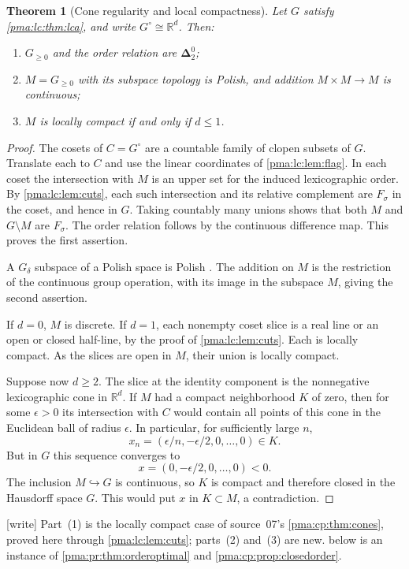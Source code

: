 \documentclass[11pt]{article}
\numberwithin{equation}{section}
\newtheorem{theorem}{Theorem}[section]
\theoremstyle{definition}
\theoremstyle{remark}
\newcommand{\R}{\mathbb R}
\newcommand{\Dtwo}{\boldsymbol{\Delta}^{0}_{2}}
\newcommand{\writetag}{\textup{\textsf{\small[write]}}}
\begin{document}
\begin{theorem}[Cone regularity and local compactness]\label{pma:lc:thm:cones}
Let $G$ satisfy \cref{pma:lc:thm:lca}, and write $G^\circ\cong\R^d$. Then:
\begin{enumerate}
\item $G_{\ge0}$ and the order relation are $\Dtwo$;
\item $M=G_{\ge0}$ with its subspace topology is Polish, and addition
      $M\times M\to M$ is continuous;
\item $M$ is locally compact if and only if $d\le1$.
\end{enumerate}
\end{theorem}
\begin{proof}
The cosets of $C=G^\circ$ are a countable family of clopen subsets of
$G$. Translate each to $C$ and use the linear coordinates of
\cref{pma:lc:lem:flag}. In each coset the intersection with $M$ is an upper
set for the induced lexicographic order. By \cref{pma:lc:lem:cuts}, each such
intersection and its relative complement are $F_\sigma$ in the coset,
and hence in $G$. Taking countably many unions shows that both $M$ and
$G\setminus M$ are $F_\sigma$. The order relation follows by the
continuous difference map. This proves the first assertion.

A $G_\delta$ subspace of a Polish space is Polish \cite{Kechris}.
The addition on $M$ is the restriction of the continuous group operation,
with its image in the subspace $M$, giving the second assertion.

If $d=0$, $M$ is discrete. If $d=1$, each nonempty coset slice is a real
line or an open or closed half-line, by the proof of \cref{pma:lc:lem:cuts}.
Each is locally compact. As the slices are open in $M$, their union is
locally compact.

Suppose now $d\ge2$. The slice at the identity component is the
nonnegative lexicographic cone in $\R^d$. If $M$ had a compact
neighborhood $K$ of zero, then for some $\epsilon>0$ its intersection
with $C$ would contain all points of this cone in the Euclidean ball
of radius $\epsilon$. In particular, for sufficiently large $n$,
\[
 x_n=(\epsilon/n,-\epsilon/2,0,\ldots,0)\in K.
\]
But in $G$ this sequence converges to
\[
 x=(0,-\epsilon/2,0,\ldots,0)<0.
\]
The inclusion $M\hookrightarrow G$ is continuous, so $K$ is compact
and therefore closed in the Hausdorff space $G$. This would put $x$
in $K\subset M$, a contradiction.
\end{proof}

\noindent\writetag{} Part~(1) is the locally compact case of source~07's
\cref{pma:cp:thm:cones}, proved here through \cref{pma:lc:lem:cuts}; parts~(2)
and~(3) are new.  below is an instance of
\cref{pma:pr:thm:orderoptimal} and \cref{pma:cp:prop:closedorder}.
\end{document}
